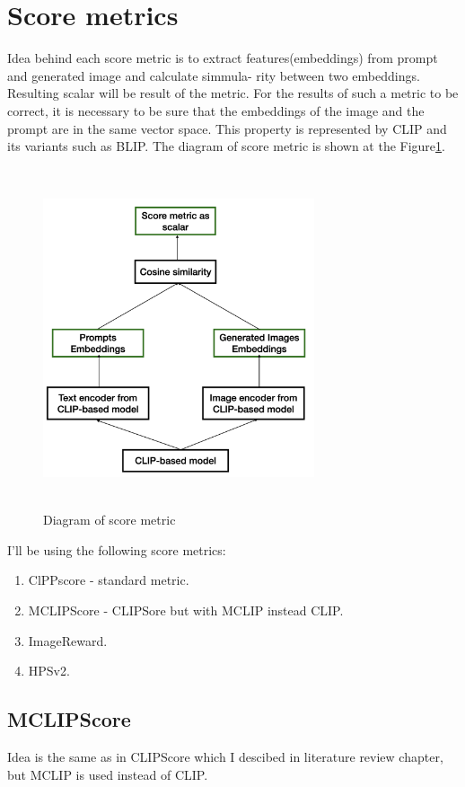 \section{Score metrics}
Idea behind each score metric is to extract
features(embeddings) from prompt and generated image and calculate simmula-
rity between two embeddings. Resulting scalar will be result of the metric. For the results of such a metric to be correct, it is necessary to be sure that the embeddings of the image and the prompt are in the same vector space. This property is represented by CLIP\cite{CLIP} and its variants such as BLIP\cite{BLIP}. The diagram of score metric is shown at the Figure\ref{fig:Score_metric}.
\begin{figure}[hbt]
\centering
\includegraphics[width=8cm, height=10cm]{figs/score_metric.png}
\caption{Diagram of score metric}
\label{fig:Score_metric}
\end{figure}
I'll be using the following score metrics:
\begin{enumerate}
    \item ClPPscore\cite{CLIPScore} - standard metric.
    \item MCLIPScore - CLIPSore but with MCLIP instead CLIP.
    \item ImageReward\cite{Image_reward}.
    \item HPSv2\cite{HPSv2}.
\end{enumerate}
\subsection{MCLIPScore}
Idea is the same as in CLIPScore which I descibed in literature review chapter, but MCLIP is used instead of CLIP.

